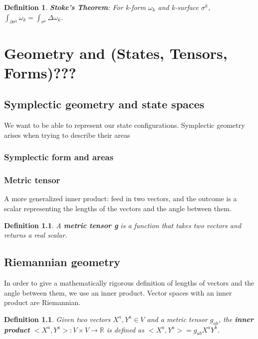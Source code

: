 \documentclass{book}
\newtheorem{defn}[equation]{Definition}
\begin{document}
\begin{defn}
	\textbf{Stoke's Theorem}: For k-form $\omega_k$ and k-surface $\sigma^k$, $\int_{\partial \sigma^k}\omega_k = \int_{\sigma^k}\Delta\omega_k$. 
\end{defn}








\chapter{Geometry and (States, Tensors, Forms)???}


\section{Symplectic geometry and state spaces}
We want to be able to represent our state configurations. Symplectic geometry arises when trying to describe their areas

\subsection{Symplectic form and areas}



\subsection{Metric tensor}
A more generalized inner product: feed in two vectors, and the outcome is a scalar representing the lengths of the vectors and the angle between them. 

\begin{defn}
	A \textbf{metric tensor g} is a function that takes two vectors and returns a real scalar. 
\end{defn}


\section{Riemannian geometry}
In order to give a mathematically rigorous definition of lengths of vectors and the angle between them, we use an inner product. Vector spaces with an inner product are Riemannian.

\begin{defn}
	Given two vectors $X^a,Y^a \in V$ and a metric tensor $g_{ab}$, the \textbf{inner product} $<X^a,Y^a> : V \times V \to \mathbb{R}$ is defined as $<X^a,Y^a> = g_{ab}X^aY^b$. 
\end{defn}
\end{document}
